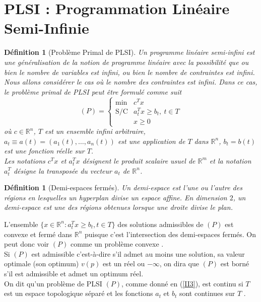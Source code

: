 \documentclass[11pt]{report}
\newenvironment{boxdefinition}
{\begin{tcolorbox}
		[enhanced jigsaw,breakable,pad at break*=1mm,
		colback=black!5!white,boxrule=0pt,frame hidden,
		borderline west={1.5mm}{-2mm}{blue}]}
	{\end{tcolorbox}}
\theoremstyle{styletheorem}
\theoremstyle{styledef}
\newtheorem{definitions}[theoreme]{Définition}
\theoremstyle{remark}
\newenvironment{definition}{\vspace*{0.3cm}\begin{boxdefinition}\begin{definitions}}{\end{definitions}\end{boxdefinition}\vspace*{0.3cm}}
\newcommand{\ie}{c'est-à-dire }
\newcommand{\R}{\ensuremath{\mathbb{R}}}
\begin{document}
\section{PLSI : Programmation Linéaire Semi-Infinie}

\begin{definition}[Problème Primal de PLSI]\cite{b2, b16}\label{321}
	Un programme linéaire semi-infini est une généralisation de la notion de programme linéaire avec la possibilité que ou bien le nombre de variables est infini, ou bien le nombre de contraintes est infini.\\
	
	Nous allons considérer le cas où le nombre des contraintes est infini. Dans ce cas, le problème primal de PLSI peut être formulé comme suit 
	\begin{equation}\label{II3}
		(P) = \left \lbrace \begin{array}{ll}
			\text{min}& c^Tx\\
			\text{S/C} & a^T_t x \geq b_t, \ t  \in T\\
			& x\geq 0
		\end{array}\right. 
	\end{equation}où $c \in \R^n$, $T$ est un ensemble infini arbitraire, $a_t \equiv a(t)=(a_1(t),\dots,a_n(t))$ est une application de $T$ dans $\R^n$, $b_t = b(t)$ est une fonction réelle sur $T$. \\ Les notations $c^T x$ et $ a_t^T x$ désignent le produit scalaire usuel de $\R^m$ et la notation $a_t^T$ désigne la transposée du vecteur $a_t$ de $\R^n$.	
\end{definition}
\begin{definition}[Demi-espaces fermés]
	Un demi-espace est l'une ou l'autre des régions en lesquelles un hyperplan divise un espace affine.
	En dimension $2$, un demi-espace est une des régions obtenues lorsque une droite divise le plan.
\end{definition}
L'ensemble $\lbrace x\in \R^n \colon  a^T_t x \geq b_t, t \in T \rbrace$ des solutions admissibles de $(P)$ est convexe et fermé dans $\R^n$ puisque c'est l'intersection des demi-espaces fermés.  On peut donc voir $(P)$ comme un problème convexe \cite{b1}.\\

Si $(P)$ est admissible \ie s'il admet au moins une solution, sa valeur optimale (son optimum) $v(p)$ est un réel ou $-\infty$, on dira que $(P)$ est borné s'il est admissible et admet un optimum réel.\\
On dit qu'un problème de PLSI $(P)$, comme donné en (\ref{II3}), est continu si $T$ est un espace topologique séparé et les fonctions $a_t$ et $b_t$ sont continues sur $T$ \cite{b1}\cite{b2}.
\end{document}
